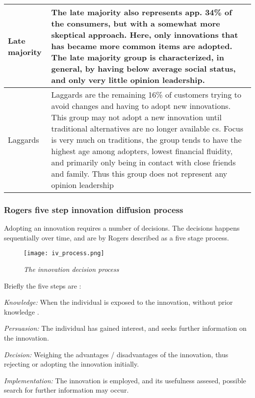 \documentclass[journal]{IEEEtran}
\begin{document}
\begin{table}[ht]
\begin{tabular}{|p{2cm} |p{5.5cm}|}
Late majority & 
The late majority also represents app. 34\% of the consumers\cite{diffusion2}, but with a somewhat more skeptical approach. Here, only innovations that has became more common items are adopted. The late majority group is characterized, in general, by having below average social status, and only very little opinion leadership\cite{rogers_model}.\\
\hline

Laggards & 
Laggards are the remaining 16\% of customers trying to avoid changes and having to adopt new innovations. This group may not adopt a new innovation until traditional alternatives are no longer available  cs\cite{diffusion2}. Focus is very much on traditions, the group tends to have the highest age among adopters, lowest financial fluidity, and primarily only being in contact with close friends and family. Thus this group does not represent any opinion leadership\cite{rogers_model}\newline \\ 
\hline

\end{tabular}
\label{table:rogers_char} %
\end{table}


\subsubsection{Rogers five step innovation diffusion process}
Adopting an innovation requires a number of decisions. The decisions happens sequentially over time, and are by Rogers \cite{rogers_model} described as a five stage process.
\begin{figure}
\texttt{[image: iv\_process.png]}
\caption{\textit{The innovation decision process}}			
\label{fig:iv_process} %
\end{figure}


Briefly the five steps are :

\textit{Knowledge:} When the individual is exposed to the innovation,  without prior knowledge .

\textit{Persuasion:} The individual has gained interest, and seeks further information on the innovation.

\textit{Decision:} Weighing the advantages / disadvantages of the innovation, thus rejecting or adopting the innovation initially. 

\textit{Implementation:} The innovation is employed, and its usefulness assesed, possible search for further information may occur.
\end{document}
